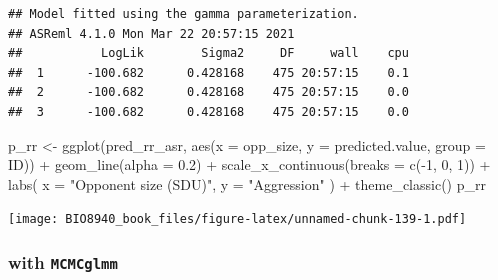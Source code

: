 \documentclass[
  12pt,
]{book}
\newenvironment{Shaded}{\begin{snugshade}}{\end{snugshade}}
\newcommand{\AttributeTok}[1]{\textcolor[rgb]{0.77,0.63,0.00}{#1}}
\newcommand{\DecValTok}[1]{\textcolor[rgb]{0.00,0.00,0.81}{#1}}
\newcommand{\FloatTok}[1]{\textcolor[rgb]{0.00,0.00,0.81}{#1}}
\newcommand{\FunctionTok}[1]{\textcolor[rgb]{0.00,0.00,0.00}{#1}}
\newcommand{\NormalTok}[1]{#1}
\newcommand{\OtherTok}[1]{\textcolor[rgb]{0.56,0.35,0.01}{#1}}
\newcommand{\SpecialCharTok}[1]{\textcolor[rgb]{0.00,0.00,0.00}{#1}}
\newcommand{\StringTok}[1]{\textcolor[rgb]{0.31,0.60,0.02}{#1}}
\begin{document}
\begin{verbatim}
## Model fitted using the gamma parameterization.
## ASReml 4.1.0 Mon Mar 22 20:57:15 2021
##           LogLik        Sigma2     DF     wall    cpu
##  1      -100.682      0.428168    475 20:57:15    0.1
##  2      -100.682      0.428168    475 20:57:15    0.0
##  3      -100.682      0.428168    475 20:57:15    0.0
\end{verbatim}

\begin{Shaded}
\begin{Highlighting}[]
\NormalTok{p\_rr }\OtherTok{\textless{}{-}} \FunctionTok{ggplot}\NormalTok{(pred\_rr\_asr, }\FunctionTok{aes}\NormalTok{(}\AttributeTok{x =}\NormalTok{ opp\_size,}
\AttributeTok{y =}\NormalTok{ predicted.value,}
\AttributeTok{group =}\NormalTok{ ID)) }\SpecialCharTok{+}
\FunctionTok{geom\_line}\NormalTok{(}\AttributeTok{alpha =} \FloatTok{0.2}\NormalTok{) }\SpecialCharTok{+}
\FunctionTok{scale\_x\_continuous}\NormalTok{(}\AttributeTok{breaks =} \FunctionTok{c}\NormalTok{(}\SpecialCharTok{{-}}\DecValTok{1}\NormalTok{, }\DecValTok{0}\NormalTok{, }\DecValTok{1}\NormalTok{)) }\SpecialCharTok{+}
  \FunctionTok{labs}\NormalTok{(}
    \AttributeTok{x =} \StringTok{"Opponent size (SDU)"}\NormalTok{,}
    \AttributeTok{y =} \StringTok{"Aggression"}
\NormalTok{  ) }\SpecialCharTok{+}
  \FunctionTok{theme\_classic}\NormalTok{()}
\NormalTok{p\_rr}
\end{Highlighting}
\end{Shaded}

\texttt{[image: BIO8940\_book\_files/figure-latex/unnamed-chunk-139-1.pdf]}

\hypertarget{with-mcmcglmm}{%
\subsubsection{\texorpdfstring{with \texttt{MCMCglmm}}{with MCMCglmm}}\label{with-mcmcglmm}}
\end{document}
